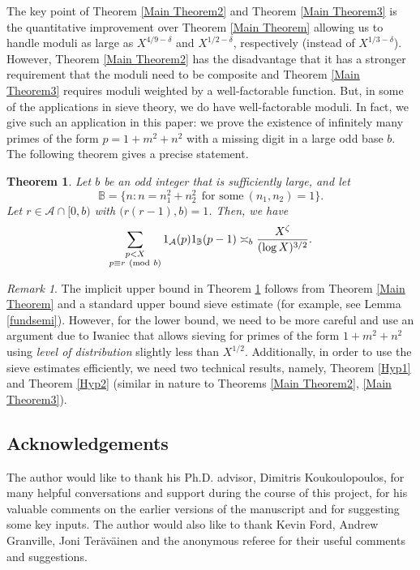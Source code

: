 \documentclass[12pt]{amsart}
\numberwithin{equation}{section}
\newtheorem{thm}{Theorem}
\theoremstyle{remark}
\newtheorem*{remark}{Remark}
\theoremstyle{definition}
\newcommand{\imod}[1]{\ (\mathrm{mod}\ #1)}
\begin{document}
The key point of Theorem \ref{Main Theorem2} and Theorem \ref{Main Theorem3} is the quantitative improvement over Theorem \ref{Main Theorem} allowing us to handle moduli as large as $X^{4/9-\delta}$ and $X^{1/2-\delta}$, respectively (instead of $X^{1/3-\delta}$). However, Theorem \ref{Main Theorem2} has the disadvantage that it has a stronger requirement that the moduli need to be composite and Theorem \ref{Main Theorem3} requires moduli weighted by a well-factorable function. But, in some of the applications in sieve theory, we do have well-factorable moduli. In fact, we give such an application in this paper: we prove the existence of infinitely many primes of the form $p=1+m^2+n^2$ with a missing digit in a large odd base $b$. The following theorem gives a precise statement.

\begin{thm}\label{Main TheoremApp}
Let $b$ be an odd integer that is sufficiently large, and let 
\[\mathbb{B}=\{n:n=n_1^2+n_2^2~~\text{for some}~(n_1, n_2)=1\}.\]
Let $r\in \mathcal{A}\cap[0, b)$ with $\big(r(r-1), b\big)=1$. Then, we have
\begin{equation}
\notag \sum_{\substack{p < X\\p\equiv r\imod b}}1_{\mathcal{A}}(p)1_{\mathbb{B}}(p-1)\asymp_{b} \dfrac{X^{\zeta}}{(\log X)^{3/2}}.
\end{equation}
\end{thm}


\begin{remark}
The implicit upper bound in Theorem \ref{Main TheoremApp} follows from Theorem \ref{Main Theorem} and a standard upper bound sieve estimate (for example, see Lemma \ref{fundsemi}). However, for the lower bound, we need to be more careful and use an argument due to Iwaniec \cite{iwa, iwa2} that allows sieving for primes of the form $1+m^2+n^2$ using \emph{level of distribution} slightly less than $X^{1/2}$. Additionally, in order to use the sieve estimates efficiently, we need two technical results, namely, Theorem \ref{Hyp1} and Theorem \ref{Hyp2} (similar in nature to Theorems \ref{Main Theorem2}, \ref{Main Theorem3}).
\end{remark}

\subsection*{Acknowledgements}
The author would like to thank his Ph.D. advisor, Dimitris Koukoulopoulos, for many helpful conversations and support during the course of this project, for his valuable comments on the earlier versions of the manuscript and for suggesting some key inputs. The author would also like to thank Kevin Ford, Andrew Granville, Joni Ter\"{a}v\"{a}inen and the anonymous referee for their useful comments and suggestions.
\end{document}
